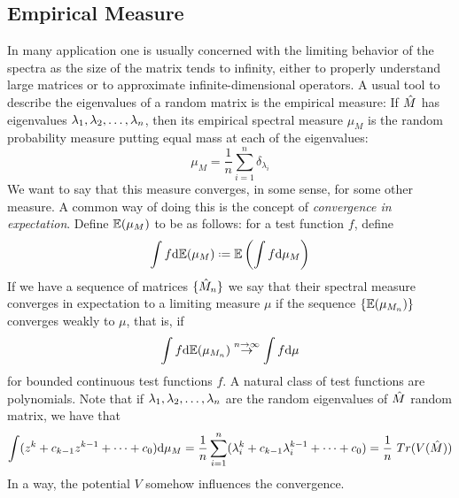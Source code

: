 \subsection{Empirical Measure}


In many application one is usually concerned with the limiting behavior of the spectra as the size of the matrix tends to infinity, either to properly understand large matrices or to approximate infinite-dimensional operators. A usual tool to describe the eigenvalues of a random matrix is the empirical measure: If $\hat M$ has eigenvalues $\lambda_1, \lambda_2, \dots, \lambda_n$, then its empirical spectral measure $\mu_M$ is the random probability measure putting equal mass at each of the eigenvalues:
\begin{equation}
	\mu_M = \frac{1}{n} \sum_{i=1}^n \delta_{\lambda_i}
\end{equation}
We want to say that this measure converges, in some sense, for some other measure. A common way of doing this is the concept of \textit{convergence in expectation}. Define $\mathbb{E}(\mu_M)$ to be as follows: for a test function $f$, define
\begin{equation}
	\int f \dd \E(\mu_M) \deff \E \left(\int f \dd \mu_M \right) 
\end{equation}
If we have a sequence of matrices $\{\hat M_n\}$ we say that their spectral measure converges in expectation to a limiting measure $\mu$ if the sequence $\{\mathbb{E}(\mu_{M_n})\}$ converges weakly to $\mu$, that is, if
\begin{equation}
	\int f \mathrm{d} \mathbb{E}(\mu_{M_n}) \stackrel{n \rightarrow \infty}{\rightarrow} \int f \mathrm{d} \mu 
\end{equation} 
for bounded continuous test functions $f$. A natural class of test functions are polynomials. Note that if $\lambda_1, \lambda_2, \dots, \lambda_n$ are the random eigenvalues of $\hat M$ random matrix, we have that
\begin{equation}
	\int (z^k + c_{k-1} z^{k-1} + \cdots + c_{0}) \dd \mu_{M} = \frac{1}{n} \sum_{i=1}^n (\lambda_i^k + c_{k-1} \lambda_i^{k-1} + \cdots + c_{0}) = \frac{1}{n} \ Tr(V(\m{M}))
\end{equation}
In a way, the potential $V$ somehow influences the convergence.
